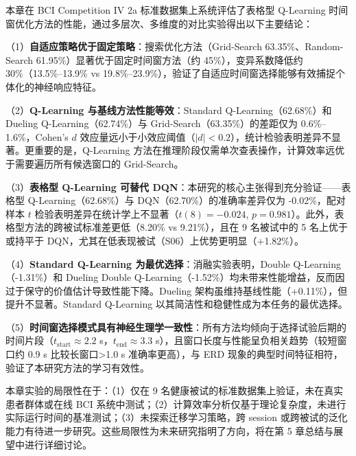 本章在 BCI Competition IV 2a 标准数据集上系统评估了表格型 Q-Learning 时间窗优化方法的性能，通过多层次、多维度的对比实验得出以下主要结论：

（1）\textbf{自适应策略优于固定策略}：搜索优化方法（Grid-Search 63.35\%、Random-Search 61.95\%）显著优于固定时间窗方法（约 45\%），变异系数降低约 30\%（13.5\%--13.9\% vs 19.8\%--23.9\%），验证了自适应时间窗选择能够有效捕捉个体化的神经响应特征。

（2）\textbf{Q-Learning 与基线方法性能等效}：Standard Q-Learning（62.68\%）和 Dueling Q-Learning（62.74\%）与 Grid-Search（63.35\%）的差距仅为 0.6\%--1.6\%，Cohen's $d$ 效应量远小于小效应阈值（$|d| < 0.2$），统计检验表明差异不显著。更重要的是，Q-Learning 方法在推理阶段仅需单次查表操作，计算效率远优于需要遍历所有候选窗口的 Grid-Search。

（3）\textbf{表格型 Q-Learning 可替代 DQN}：本研究的核心主张得到充分验证——表格型 Q-Learning（62.68\%）与 DQN（62.70\%）的准确率差异仅为 -0.02\%，配对样本 $t$ 检验表明差异在统计学上不显著（$t(8) = -0.024$, $p = 0.981$）。此外，表格型方法的跨被试标准差更低（8.20\% vs 9.21\%），且在 9 名被试中的 5 名上优于或持平于 DQN，尤其在低表现被试（S06）上优势更明显（+1.82\%）。

（4）\textbf{Standard Q-Learning 为最优选择}：消融实验表明，Double Q-Learning（-1.31\%）和 Dueling Double Q-Learning（-1.52\%）均未带来性能增益，反而因过于保守的价值估计导致性能下降。Dueling 架构虽维持基线性能（+0.11\%），但提升不显著。Standard Q-Learning 以其简洁性和稳健性成为本任务的最优选择。

（5）\textbf{时间窗选择模式具有神经生理学一致性}：所有方法均倾向于选择试验后期的时间片段（$t_{\text{start}} \approx 2.2$ s，$t_{\text{end}} \approx 3.3$ s），且窗口长度与性能呈负相关趋势（较短窗口约 0.9 s 比较长窗口>1.0 s 准确率更高），与 ERD 现象的典型时间特征相符，验证了本研究方法的学习有效性。

本章实验的局限性在于：（1）仅在 9 名健康被试的标准数据集上验证，未在真实患者群体或在线 BCI 系统中测试；（2）计算效率分析仅基于理论复杂度，未进行实际运行时间的基准测试；（3）未探索迁移学习策略，跨 session 或跨被试的泛化能力有待进一步研究。这些局限性为未来研究指明了方向，将在第 5 章总结与展望中进行详细讨论。